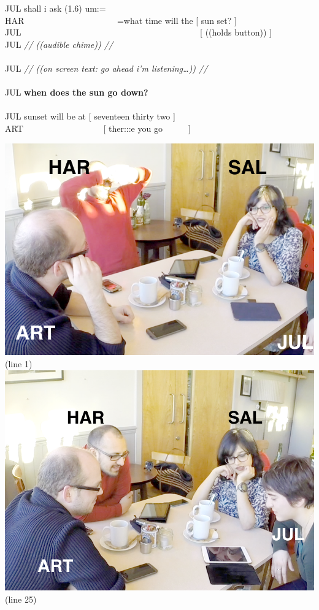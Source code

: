 \begin{inlinefrag}
\begin{transcript}
        \by JUL {shall i ask (1.6) um:=} \\
        \by HAR {~~~~~~~~~~~~~~~~~~~~~=what time will the [ sun set? ]} \\
        \by JUL {~~~~~~~~~~~~~~~~~~~~~~~~~~~~~~~~~~~~~~~~~[ ((holds button)) ]} \\
        \by JUL {\textit{// ((audible chime)) //}} \\
         \\
        \by JUL {\textit{ // ((on screen text: go ahead i’m listening\ldots)) //}} \\
         \\
        \by JUL {\textbf{when does the sun go down?}} \\
         \\
        \by JUL {sunset will be at [ seventeen thirty two ]} \\
        \by ART {~~~~~~~~~~~~~~~~~~[ ther:::e you go~~~~~~]} \\
    \end{transcript}
    \begin{center}
            \includegraphics[width=.5\linewidth]{Graphics/3-2-Empirical-Cafe/FragmentSunset-1}\\
            (line 1)\\[1cm]
            \includegraphics[width=.5\linewidth]{Graphics/3-2-Empirical-Cafe/FragmentSunset-2}\\
            (line 25)
    \end{center}
\end{inlinefrag}


